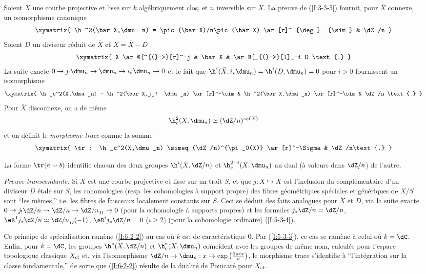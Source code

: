 \subsubsection{}\label{I:6-2-1}

Soient $\bar X$ une courbe projective et lisse sur $k$ algébriquement clos, et 
$n$ inversible sur $\bar X$. La preuve de (\ref{I:3-3-5}) fournit, pour 
$\bar X$ connexe, un isomorphisme canonique 
\[\xymatrix{
  \h^2(\bar X,\dmu_n) = \pic(\bar X)/n\pic(\bar X) \ar[r]^-{\deg}_-{\sim}
    & \dZ/n
}\]
Soient $D$ un diviseur réduit de $\bar X$ et $X=\bar X-D$ 
\[\xymatrix{
  X \ar@{^{(}->}[r]^-j 
    & \bar X 
    & \ar@{_{(}->}[l]_-i D \text{.}
}\]
La suite exacte $0\to j_! \dmu_n \to \dmu_n\to i_* \dmu_n\to 0$ et le fait que 
$\h^i(\bar X,i_*\dmu_n) = \h^i(D,\dmu_n)=0$ pour $i>0$ fournissent un 
isomorphisme 
\[\xymatrix{
  \h_c^2(X,\dmu_n) = \h^2(\bar X,j_! \dmu_n) \ar[r]^-\sim 
    & \h^2(\bar X,\dmu_n) \ar[r]^-\sim 
    & \dZ/n \text{.}
}\]
Pour $\bar X$ disconnexe, on a de même 
\[
  \h_c^2(X,\dmu_n) \simeq (\dZ/n)^{\pi_0(X)}
\]
et on définit le \emph{morphisme trace} comme la somme 
\[\xymatrix{
  \tr : \h_c^2(X,\dmu_n) \simeq (\dZ/n)^{\pi_0(X)} \ar[r]^-\Sigma
    & \dZ/n\text{.}
}\]





\begin{theorem}\label{I:6-2-2}
La forme $\tr(a\smallsmile b)$ identifie chacun des deux groupes $\h^i(X,\dZ/n)$ 
et $\h_c^{2-i}(X,\dmu_n)$ au dual (à valeurs dans $\dZ/n$) de l'autre. 
\end{theorem}

\emph{Preuve transcendante.} Si $\bar X$ est une courbe projective et lisse sur 
un trait $S$, et que $j:X\hookrightarrow \bar X$ est l'inclusion du 
complémentaire d'un diviseur $D$ étale sur $S$, les cohomologies (resp. 
les cohomologies à support propre) des fibres géométriques spéciales et 
génériques de $X/S$ sont ``les mêmes,'' i.e. les fibres de faisceaux 
localement constants sur $S$. Ceci se déduit des faits analogues pour 
$\bar X$ et $D$, via la suite exacte $0\to j_! \dZ/n\to\dZ/n\to {\dZ/n}_D\to 0$ 
(pour la cohomologie à supports propres) et les formules $j_*\dZ/n = \dZ/n$, 
$\eR^1 j_* \dZ/n \simeq {\dZ/n}_D(-1)$, $\eR^i j_*\dZ/n = 0$ ($i\geqslant 2$) 
(pour la cohomologie ordinaire) (\ref{I:5-3-4}). 

Ce principe de spécialisation ramène (\ref{I:6-2-2}) au cas où $k$ est de 
caractéristique $0$. Par (\ref{I:5-3-3}), ce cas se ramène à celui où 
$k=\dC$. Enfin, pour $k=\dC$, les groupes $\h^*(X,\dZ/n)$ et 
$\h_c^*(X,\dmu_n)$ coïncident avec les groupes de même nom, calculés 
pour l'espace topologique classique $X_{\textnormal{cl}}$ et, via 
l'isomorphisme $\dZ/n\to \dmu_n: x\mapsto \exp\left(\frac{2\pi i x}{n}\right)$, 
le morphisme trace s'identifie à ``l'intégration sur la classe fondamentale,'' 
de sorte que (\ref{I:6-2-2}) résulte de la dualité de Poincaré pour 
$X_{\textnormal{cl}}$. 





